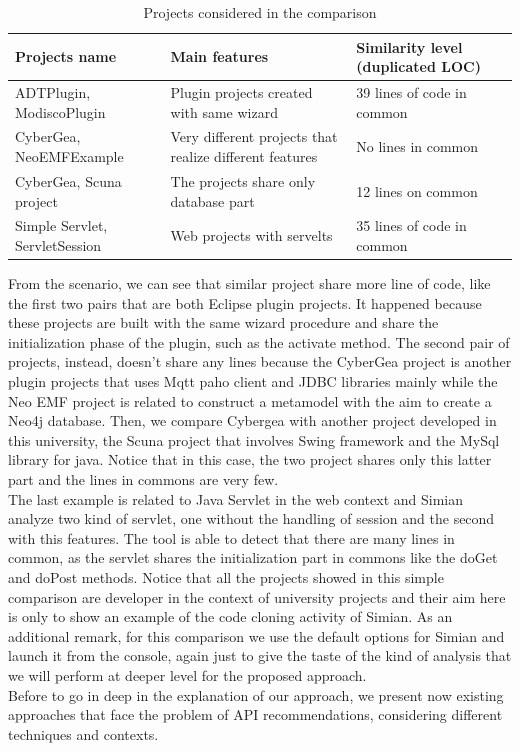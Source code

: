 \begin{center}
\begin{table}[H]
  \caption{ Projects considered in the comparison }
  \label{Table:4}
\begin{adjustbox}{width=1\textwidth}
\small
\begin{tabular}{|l|p{5cm}|p{3cm}|}

\hline
 \textbf{Projects name} &  \textbf{Main features}  & \textbf{Similarity level (duplicated LOC)}  \\
\hline
 ADTPlugin, ModiscoPlugin   &  Plugin projects created with same wizard & 39 lines of code in common\\
\hline
CyberGea, NeoEMFExample &   Very different projects that realize different features & No lines in common\\
\hline
CyberGea, Scuna project & The projects share only database part & 12 lines on common  \\
\hline
Simple Servlet, ServletSession &  Web projects with servelts & 35 lines of code in common  \\
\hline
\end{tabular}

\end{adjustbox}
\end{table} 
\end{center}

From the scenario, we can see that similar project share more line of code, like the first two pairs that are both Eclipse plugin projects. It happened because these projects are built with the same wizard procedure and share the initialization phase of the plugin, such as the activate method. The second pair of projects, instead, doesn't share any lines because the CyberGea project is another plugin projects that uses Mqtt paho client and JDBC libraries mainly while the Neo EMF project is related to construct a metamodel with the aim to create a Neo4j database. Then, we compare Cybergea with another project developed in this university, the Scuna project that involves Swing framework and the MySql library for java. Notice that in this case, the two project shares only this latter part and the lines in commons are very few. \\
The last example is related to Java Servlet in the web context and Simian analyze two kind of servlet, one without the handling of session and the second with this features. The tool is able to detect that there are many lines in common, as the servlet shares the initialization part in commons like the doGet and doPost methods. Notice that all the projects showed in this simple comparison are developer in the context of university projects and their aim here is only to show an example of the code cloning activity of Simian. As an additional remark, for this comparison we use the default options for Simian and launch it from the console, again just to give the taste of the kind of analysis that we will perform at deeper level for the proposed approach. \\ 
Before to go in deep in the explanation of our approach, we present now existing approaches that face the problem of API recommendations, considering different techniques and contexts.